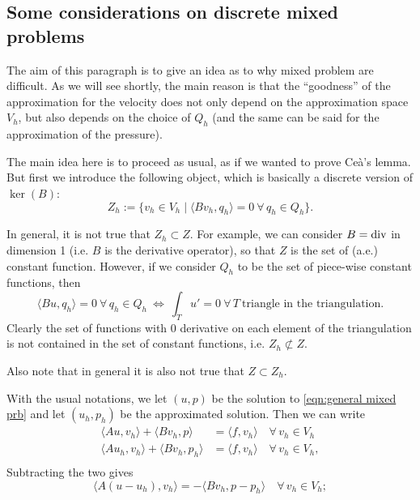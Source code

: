 \subsection{Some considerations on discrete mixed problems}
The aim of this paragraph is to give an idea as to why mixed problem are difficult. As we will see shortly, the main reason is that the ``goodness'' of the approximation for the velocity does not only depend on the approximation space $V_h$, but also depends on the choice of $Q_h$ (and the same can be said for the approximation of the pressure).\par
The main idea here is to proceed as usual, as if we wanted to prove Ceà's lemma. But first we introduce the following object, which is basically a discrete version of $\ker(B)$:
\begin{equation*}
    Z_h:=\{ v_h\in V_h \mid \langle Bv_h,q_h\rangle=0 \ \forall\,q_h\in Q_h \}.
\end{equation*}
\begin{remark}
    In general, it is not true that $Z_h\subset Z$. For example, we can consider $B=\operatorname{div}$ in dimension 1 (i.e. $B$ is the derivative operator), so that $Z$ is the set of (a.e.) constant function. However, if we consider $Q_h$ to be the set of piece-wise constant functions, then
    \begin{equation*}
        \langle Bu,q_h\rangle=0 \ \forall\, q_h\in Q_h \ \iff \ \int_T u'=0 \ \forall \, T \ \text{triangle in the triangulation}.
    \end{equation*}
    Clearly the set of functions with 0 derivative on each element of the triangulation is not contained in the set of constant functions, i.e. $Z_h\not\subset Z$.\par
    Also note that in general it is also not true that $Z\subset Z_h$.
\end{remark}
With the usual notations, we let $(u,p)$ be the solution to \eqref{eqn:general mixed prb} and let $(u_h,p_h)$ be the approximated solution. Then we can write
\begin{align*}
    \langle Au,v_h\rangle+\langle Bv_h,p\rangle&=\langle f,v_h\rangle \quad \forall\,v_h\in V_h\\
    \langle Au_h,v_h\rangle+\langle Bv_h,p_h\rangle&=\langle f,v_h\rangle \quad \forall\,v_h\in V_h,\\
\end{align*}
Subtracting the two gives
\begin{equation*}
    \langle A(u-u_h),v_h\rangle=-\langle Bv_h,p-p_h\rangle \quad \forall\, v_h\in V_h;
\end{equation*}
